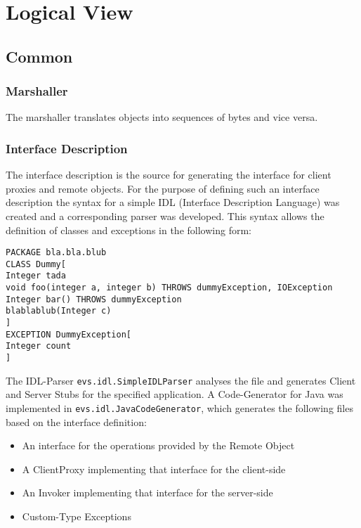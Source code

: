 \section{Logical View}

\cite{zdun2008}

\subsection{Common}
\subsubsection{Marshaller}

The marshaller translates objects into sequences of bytes and vice versa.

\subsubsection{Interface Description}
The interface description is the source for generating the interface for client proxies and remote objects. For the purpose of defining such an interface description the syntax for a simple IDL (Interface Description Language) was created and a corresponding parser was developed. This syntax allows the definition of classes and exceptions in the following form:

\begin{code}
\begin{verbatim}
PACKAGE bla.bla.blub
CLASS Dummy[
Integer tada
void foo(integer a, integer b) THROWS dummyException, IOException
Integer bar() THROWS dummyException
blablablub(Integer c)
]
EXCEPTION DummyException[
Integer count
]
\end{verbatim}
\end{code}

The IDL-Parser \texttt{evs.idl.SimpleIDLParser} analyses the file and generates Client and Server Stubs for the specified application. A Code-Generator for Java was implemented in \texttt{evs.idl.JavaCodeGenerator}, which generates the following files based on the interface definition:

\begin{itemize}\itemsep0pt
\item An interface for the operations provided by the Remote Object
\item A ClientProxy implementing that interface for the client-side
\item An Invoker implementing that interface for the server-side
\item Custom-Type Exceptions
\end{itemize}

